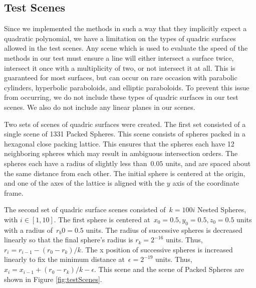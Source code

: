 \documentclass{cccg16}
\begin{document}
\subsection{Test Scenes}
Since we implemented the methods in such a way that they implicitly
expect a quadratic polynomial, we have a limitation on the types of
quadric surfaces allowed in the test scenes.  Any scene which is used
to evaluate the speed of the methods in our test must ensure a line
will either intersect a surface twice, intersect it once with a
multiplicity of two, or not intersect it at all.  This is guaranteed
for most surfaces, but can occur on rare occasion with parabolic
cylinders, hyperbolic paraboloids, and elliptic paraboloids.  To
prevent this issue from occurring, we do not include these types of
quadric surfaces in our test scenes.  We also do not include any
linear planes in our scenes.

Two sets of scenes of quadric surfaces were created.  The first set
consisted of a single scene of 1331 Packed Spheres.  This scene
consists of spheres packed in a hexagonal close packing lattice.  This
ensures that the spheres each have 12 neighboring spheres which may
result in ambiguous intersection orders.  The spheres each have a
radius of slightly less than~$0.05$ units, and are spaced about the
same distance from each other.  The initial sphere is centered at the
origin, and one of the axes of the lattice is aligned with the $y$
axis of the coordinate frame.

The second set of quadric surface scenes consisted of~$k=100i$ Nested
Spheres, with $i\in[1, 10]$.  The first sphere is centered
at~$x_0=0.5, y_0=0.5, z_0=0.5$ units with a radius of~$r_b0=0.5$
units.  The radius of successive spheres is decreased linearly so that
the final sphere's radius is $r_k=2^{-16}$ units.  Thus,
$r_i=r_{i-1}-(r_0-r_k)/k$.  The x position of successive spheres is
increased linearly to fix the minimum distance at~$\epsilon=2^{-19}$
units. Thus, $x_i=x_{i-1}+(r_0-r_k)/k-\epsilon$. This scene and the
scene of Packed Spheres are shown in Figure \ref{fig:testScenes}.
\end{document}
